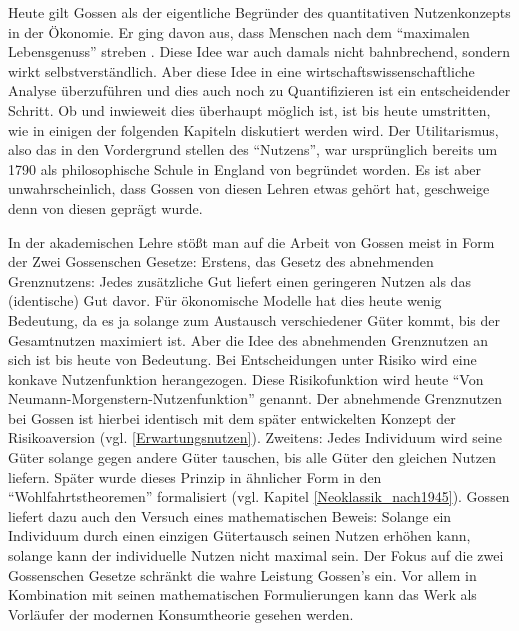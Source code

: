 Heute gilt Gossen als der eigentliche Begründer des quantitativen Nutzenkonzepts in der Ökonomie. Er ging davon aus, dass Menschen nach dem "`maximalen Lebensgenuss"' streben \parencite[S. 284]{Rosner2012}. Diese Idee war auch damals nicht bahnbrechend, sondern wirkt selbstverständlich. Aber diese Idee in eine wirtschaftswissenschaftliche Analyse überzuführen und dies auch noch zu Quantifizieren ist ein entscheidender Schritt. Ob und inwieweit dies überhaupt möglich ist, ist bis heute umstritten, wie in einigen der folgenden Kapiteln diskutiert werden wird. Der Utilitarismus, also das in den Vordergrund stellen des "`Nutzens"', war ursprünglich bereits um 1790 als philosophische Schule in England von \textcite{Bentham1789} begründet worden. Es ist aber unwahrscheinlich, dass Gossen von diesen Lehren etwas gehört hat, geschweige denn von diesen geprägt wurde. 

In der akademischen Lehre stößt man auf die Arbeit von Gossen meist in Form der Zwei Gossenschen Gesetze: Erstens, das Gesetz des abnehmenden Grenznutzens: Jedes zusätzliche Gut liefert einen geringeren Nutzen als das (identische) Gut davor. Für ökonomische Modelle hat dies heute wenig Bedeutung, da es ja solange zum Austausch verschiedener Güter kommt, bis der Gesamtnutzen maximiert ist. Aber die Idee des abnehmenden Grenznutzen an sich ist bis heute von Bedeutung. Bei Entscheidungen unter Risiko wird eine konkave Nutzenfunktion herangezogen. Diese Risikofunktion wird heute "`Von Neumann-Morgenstern-Nutzenfunktion"' genannt. Der abnehmende Grenznutzen bei Gossen ist hierbei identisch mit dem später entwickelten Konzept der Risikoaversion (vgl. \ref{Erwartungsnutzen}).
Zweitens: Jedes Individuum wird seine Güter solange gegen andere Güter tauschen, bis alle Güter den gleichen Nutzen liefern. Später wurde dieses Prinzip in ähnlicher Form in den "`Wohlfahrtstheoremen"' formalisiert (vgl. Kapitel \ref{Neoklassik_nach1945}). Gossen liefert dazu auch den Versuch eines mathematischen Beweis: Solange ein Individuum durch einen einzigen Gütertausch seinen Nutzen erhöhen kann, solange kann der individuelle Nutzen nicht maximal sein.
Der Fokus auf die zwei Gossenschen Gesetze schränkt die wahre Leistung Gossen's ein. Vor allem in Kombination mit seinen mathematischen Formulierungen kann das Werk als Vorläufer der modernen Konsumtheorie gesehen werden.

